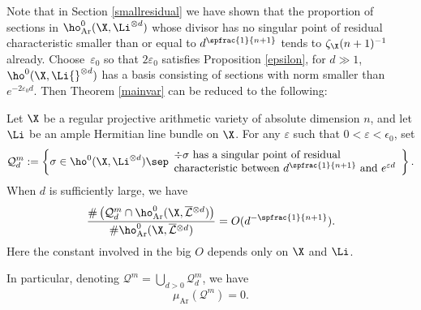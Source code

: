 Note that in Section \ref{smallresidual} we have shown that the proportion of sections in $\ho_{\mathrm{Ar}}^0(\X,\Li^{\otimes d})$ whose divisor has no singular point of residual characteristic smaller than or equal to $d^{\spfrac{1}{n+1}}$ tends to $\zeta_\X(n+1)^{-1}$ already. Choose~$\varepsilon_0$ so that $2\varepsilon_0$ satisfies Proposition \ref{epsilon}, \ie for $d\gg 1$, $\ho^0(\X,\Li{}^{\otimes d})$ has a basis consisting of sections with norm smaller than $e^{-2\varepsilon_0 d}$. Then Theorem \ref{mainvar} can be reduced to the following:
\begin{prop}\label{medsing}
Let $\X$ be a regular projective arithmetic variety of absolute dimension $n$, and let $\Li$ be an ample Hermitian line bundle on $\X$. For any $\varepsilon$ such that $0<\varepsilon<\epsilon_0$, set
\[
\mathcal{Q}_{d}^m:=\left\{ \sigma\in \ho^0(\X,\Li^{\otimes d})\sep \begin{array}{ll}
\div \sigma \text{ has a singular point of residual} \\
\text{characteristic between } d^{\spfrac{1}{n+1}} \text{ and } e^{\varepsilon d}
\end{array}\right\}.
\]
When $d$ is sufficiently large, we have
\[
\frac{\#\left(\mathcal{Q}_{d}^m\cap \ho^0_{\mathrm{Ar}}(\X, \overline{\mathcal{L}}{}^{\otimes d})\right)}{\#\ho^0_{\mathrm{Ar}}(\X, \overline{\mathcal{L}}{}^{\otimes d})} = O(d^{-\spfrac{1}{n+1}}).
\]
Here the constant involved in the big $O$ depends only on $\X$ and $\Li$.

In particular, denoting $\mathcal{Q}^m=\bigcup_{d>0}\mathcal{Q}_{d}^m$, we have
\[
\mu_{\mathrm{Ar}}(\mathcal{Q}^m)=0.
\]
\end{prop}

